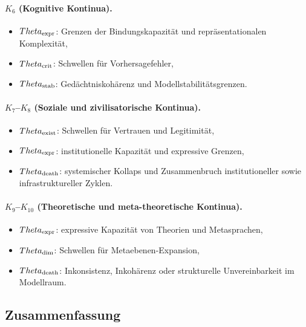 \paragraph{\texorpdfstring{\(K_6\)}{K_6} (Kognitive Kontinua).}
\begin{itemize}
    \item \(\Theta_{\rm expr}\): Grenzen der Bindungskapazität und repräsentationalen
          Komplexität,
    \item \(\Theta_{\rm crit}\): Schwellen für Vorhersagefehler,
    \item \(\Theta_{\rm stab}\): Gedächtniskohärenz und Modellstabilitätsgrenzen.
\end{itemize}

\paragraph{\texorpdfstring{\(K_7\)}{K_7}–\texorpdfstring{\(K_8\)}{K_8} (Soziale und zivilisatorische Kontinua).}
\begin{itemize}
    \item \(\Theta_{\rm exist}\): Schwellen für Vertrauen und Legitimität,
    \item \(\Theta_{\rm expr}\): institutionelle Kapazität und expressive Grenzen,
    \item \(\Theta_{\rm death}\): systemischer Kollaps und Zusammenbruch institutioneller
          sowie infrastruktureller Zyklen.
\end{itemize}

\paragraph{\texorpdfstring{\(K_9\)}{K_9}–\(K_{10}\) (Theoretische und meta-theoretische Kontinua).}
\begin{itemize}
    \item \(\Theta_{\rm expr}\): expressive Kapazität von Theorien und
          Metasprachen,
    \item \(\Theta_{\rm dim}\): Schwellen für Metaebenen-Expansion,
    \item \(\Theta_{\rm death}\): Inkonsistenz, Inkohärenz oder strukturelle
          Unvereinbarkeit im Modellraum.
\end{itemize}

\subsection{Zusammenfassung}


